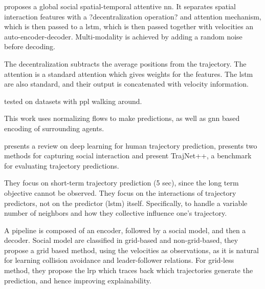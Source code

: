 \cite{xu2021tra2tra} proposes a global social spatial-temporal attentive \gls{nn}. 
%
It separates spatial interaction features with a ?decentralization operation? and attention mechanism, which is then passed to a \gls{lstm}, which is then passed together with velocities an auto-encoder-decoder.
%
Multi-modality is achieved by adding a random noise before decoding.

The decentralization subtracts the average positions from the trajectory.
%
The attention is a standard attention which gives weights for the features.
%
The \gls{lstm} are also standard, and their output is concatenated with velocity information.

tested on datasets with ppl walking around.

\cite{scholler2021flomo} This work uses normalizing flows to make predictions, as well as gnn based encoding of surrounding agents.


\cite{kothari2021human} presents a review on deep learning for human trajectory prediction, presents two methods for capturing social interaction and present TrajNet++, a benchmark for evaluating trajectory predictions. 

They focus on short-term trajectory prediction (5 sec), since the long term objective cannot be observed.
%
They focus on the interactions of trajectory predictors, not on the predictor (\gls{lstm}) itself.
%
Specifically, to handle a variable number of neighbors and how they collective influence one's trajectory.

A pipeline is composed of an encoder, followed by a social model, and then a decoder.
%
Social model are classified in grid-based and non-grid-based, they propose a grid based method, using the velocities as observations, as it is natural for learning collision avoidance and leader-follower relations.
%
For grid-less method, they propose the \gls{lrp} which traces back which trajectories generate the prediction, and hence improving explainability.



